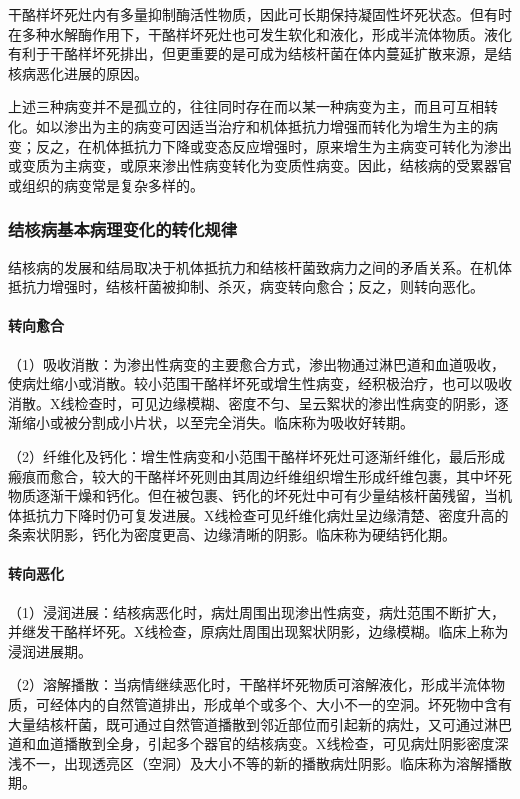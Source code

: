 干酪样坏死灶内有多量抑制酶活性物质，因此可长期保持凝固性坏死状态。但有时在多种水解酶作用下，干酪样坏死灶也可发生软化和液化，形成半流体物质。液化有利于干酪样坏死排出，但更重要的是可成为结核杆菌在体内蔓延扩散来源，是结核病恶化进展的原因。

上述三种病变并不是孤立的，往往同时存在而以某一种病变为主，而且可互相转化。如以渗出为主的病变可因适当治疗和机体抵抗力增强而转化为增生为主的病变；反之，在机体抵抗力下降或变态反应增强时，原来增生为主病变可转化为渗出或变质为主病变，或原来渗出性病变转化为变质性病变。因此，结核病的受累器官或组织的病变常是复杂多样的。

\subsubsection{结核病基本病理变化的转化规律}

结核病的发展和结局取决于机体抵抗力和结核杆菌致病力之间的矛盾关系。在机体抵抗力增强时，结核杆菌被抑制、杀灭，病变转向愈合；反之，则转向恶化。

\paragraph{转向愈合}
（1）吸收消散：为渗出性病变的主要愈合方式，渗出物通过淋巴道和血道吸收，使病灶缩小或消散。较小范围干酪样坏死或增生性病变，经积极治疗，也可以吸收消散。X线检查时，可见边缘模糊、密度不匀、呈云絮状的渗出性病变的阴影，逐渐缩小或被分割成小片状，以至完全消失。临床称为吸收好转期。

（2）纤维化及钙化：增生性病变和小范围干酪样坏死灶可逐渐纤维化，最后形成瘢痕而愈合，较大的干酪样坏死则由其周边纤维组织增生形成纤维包裹，其中坏死物质逐渐干燥和钙化。但在被包裹、钙化的坏死灶中可有少量结核杆菌残留，当机体抵抗力下降时仍可复发进展。X线检查可见纤维化病灶呈边缘清楚、密度升高的条索状阴影，钙化为密度更高、边缘清晰的阴影。临床称为硬结钙化期。

\paragraph{转向恶化}
（1）浸润进展：结核病恶化时，病灶周围出现渗出性病变，病灶范围不断扩大，并继发干酪样坏死。X线检查，原病灶周围出现絮状阴影，边缘模糊。临床上称为浸润进展期。

（2）溶解播散：当病情继续恶化时，干酪样坏死物质可溶解液化，形成半流体物质，可经体内的自然管道排出，形成单个或多个、大小不一的空洞。坏死物中含有大量结核杆菌，既可通过自然管道播散到邻近部位而引起新的病灶，又可通过淋巴道和血道播散到全身，引起多个器官的结核病变。X线检查，可见病灶阴影密度深浅不一，出现透亮区（空洞）及大小不等的新的播散病灶阴影。临床称为溶解播散期。

